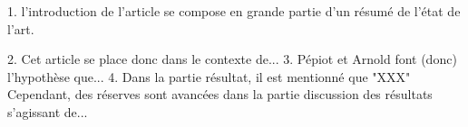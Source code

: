 1.
l'introduction de l'article se compose en grande partie d'un résumé de l'état de l'art.

2.
Cet article se place donc dans le contexte de...
3.
Pépiot et Arnold font (donc) l'hypothèse que...
4.
Dans la partie résultat, il est mentionné que "XXX"
Cependant, des réserves sont avancées dans la partie discussion des résultats s'agissant de...
